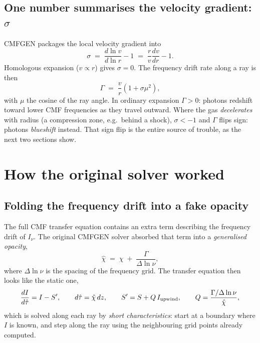 \documentclass[11pt,a4paper]{article}
\begin{document}
\subsection{One number summarises the velocity gradient: \texorpdfstring{$\sigma$}{sigma}}

CMFGEN packages the local velocity gradient into
\begin{equation}
  \sigma \;=\; \frac{d\ln v}{d\ln r} - 1
           \;=\; \frac{r}{v}\frac{dv}{dr} - 1 .
  \label{eq:sigma}
\end{equation}
Homologous expansion ($v \propto r$) gives $\sigma = 0$.  The frequency
drift rate along a ray is then
\begin{equation}
  \Gamma \;=\; \frac{v}{r}\left(1 + \sigma\mu^2\right),
  \label{eq:gamma}
\end{equation}
with $\mu$ the cosine of the ray angle.  In ordinary expansion
$\Gamma > 0$: photons redshift toward lower CMF frequencies as they
travel outward.  Where the gas \emph{decelerates} with radius (a
compression zone, e.g.\ behind a shock), $\sigma < -1$ and $\Gamma$
flips sign: photons \emph{blueshift} instead.  That sign flip is the
entire source of trouble, as the next two sections show.

\section{How the original solver worked}
\label{sec:original}

\subsection{Folding the frequency drift into a fake opacity}

The full CMF transfer equation contains an extra term describing the
frequency drift of $I_\nu$.  The original CMFGEN solver absorbed that
term into a \emph{generalised opacity},
\begin{equation}
  \hat\chi \;=\; \chi \;+\; \frac{\Gamma}{\Delta\ln\nu},
  \label{eq:chihat}
\end{equation}
where $\Delta\ln\nu$ is the spacing of the frequency grid.  The transfer
equation then looks like the static one,
\begin{equation}
  \frac{dI}{d\hat\tau} = I - S',
  \qquad
  d\hat\tau = \hat\chi\,dz,
  \qquad
  S' = S + Q\,I_{\rm upwind},
  \qquad
  Q = \frac{\Gamma/\Delta\ln\nu}{\hat\chi},
  \label{eq:shortchar}
\end{equation}
which is solved along each ray by \emph{short characteristics}: start at
a boundary where $I$ is known, and step along the ray using the
neighbouring grid points already computed.
\end{document}
